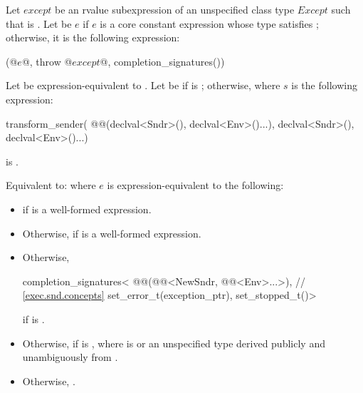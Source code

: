 \begin{itemdescr}
\pnum
Let $except$ be an rvalue subexpression of
an unspecified class type $Except$ such that
is .
Let  be $e$
if $e$ is a core constant expression whose
type satisfies ;
otherwise, it is the following expression:
\begin{codeblock}
(@$e$@, throw @$except$@, completion_signatures())
\end{codeblock}
Let 
be expression-equivalent to
.
Let  be 
if  is ;
otherwise, 
where $s$ is the following expression:
\begin{codeblock}
transform_sender(
  @@(declval<Sndr>(), declval<Env>()...),
  declval<Sndr>(),
  declval<Env>()...)
\end{codeblock}

\pnum
\constraints
{} is .

\pnum
\effects
Equivalent to: 
where $e$ is expression-equivalent to the following:
\begin{itemize}
\item
{}
if 
is a well-formed expression.

\item
Otherwise,
if 
is a well-formed expression.

\item
Otherwise,
\begin{codeblock}
completion_signatures<
  @@(@@<NewSndr, @@<Env>...>),   // \ref{exec.snd.concepts}
  set_error_t(exception_ptr),
  set_stopped_t()>
\end{codeblock}
if 
is .

\item
Otherwise,
if  is ,
where  is
 or
an unspecified type derived publicly and unambiguously from
.

\item
Otherwise,
.
\end{itemize}
\end{itemdescr}

